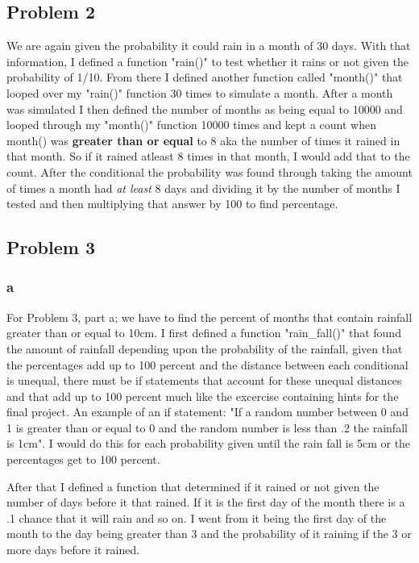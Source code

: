 \documentclass[twocolumn]{revtex4}
\begin{document}
\subsection{Problem 2}
We are again given the probability it could rain in a month of 30 days. With that information, I defined a function "rain()" to test whether it rains or not given the probability of 1/10. From there I defined another function called "month()" that looped over my "rain()" function 30 times to simulate a month. After a month was simulated I then defined the number of months as being equal to 10000 and looped through my "month()" function 10000 times and kept a count when month() was \textbf{greater than or equal} to 8 aka the number of times it rained in that month. So if it rained atleast 8 times in that month, I would add that to the count. After the conditional the probability was found through taking the amount of times a month had \textit{at least} 8 days and dividing it by the number of months I tested and then multiplying that answer by 100 to find percentage.
\subsection{Problem 3}

\subsubsection{a}
For Problem 3, part a;  we have to find the percent of months that contain rainfall greater than or equal to 10cm. I first defined a function "rain\_fall()" that found the amount of rainfall depending upon the probability of the rainfall, given that the percentages add up to 100 percent and the distance between each conditional is unequal, there must be if statements that account for these unequal distances and that add up to 100 percent much like the excercise containing hints for the final project. An example of an if statement: "If a random number between 0 and 1 is greater than or equal to 0 and the random number is less than .2 the rainfall is 1cm". I would do this for each probability given until the rain fall is 5cm or the percentages get to 100 percent.

After that I defined a function that determined if it rained or not given the number of days before it that rained. If it is the first day of the month there is a .1 chance that it will rain and so on. I went from it being the first day of the month to the day being greater than 3 and the probability of it raining if the 3 or more days before it rained. 
\end{document}

